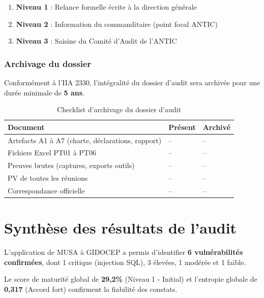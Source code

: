 \documentclass[12pt,a4paper,oneside]{report}
\begin{document}
\begin{enumerate}[leftmargin=*, itemsep=2pt]
	\item \textbf{Niveau 1} : Relance formelle écrite à la direction générale
	\item \textbf{Niveau 2} : Information du commanditaire (point focal ANTIC)
	\item \textbf{Niveau 3} : Saisine du Comité d'Audit de l'ANTIC
\end{enumerate}

\subsubsection{Archivage du dossier}

Conformément à l'IIA 2330, l'intégralité du dossier d'audit sera archivée pour une durée minimale de \textbf{5 ans}.
\begin{table}[H]
	\centering\small
	\caption{Checklist d'archivage du dossier d'audit}
	\label{tab:archivage_ch3}
	\begin{tabularx}{\textwidth}{|>{\raggedright\arraybackslash}X|>{\centering\arraybackslash}p{2.5cm}|>{\centering\arraybackslash}p{2.5cm}|}
		\hline
		\rowcolor{theadcolor}
		\color{white}\textbf{Document} &
		\color{white}\textbf{Présent} &
		\color{white}\textbf{Archivé} \\
		\hline
		Artefacts A1 à A7 (charte, déclarations, rapport) & -- & -- \\
		\hline
		Fichiers Excel PT01 à PT06 & -- & -- \\
		\hline
		Preuves brutes (captures, exports outils) & -- & -- \\
		\hline
		PV de toutes les réunions & -- & -- \\
		\hline
		Correspondance officielle & -- & -- \\
		\hline
	\end{tabularx}
\end{table}
\section*{Synthèse des résultats de l'audit}

L'application de MUSA à GIDOCEP a permis d'identifier \textbf{6 vulnérabilités 
	confirmées}, dont 1 critique (injection SQL), 3 élevées, 1 modérée et 1 faible.

Le score de maturité global de \textbf{29,2\%} (Niveau 1 - Initial) et 
l'entropie globale de \textbf{0,317} (Accord fort) confirment la fiabilité 
des constats.
\end{document}
